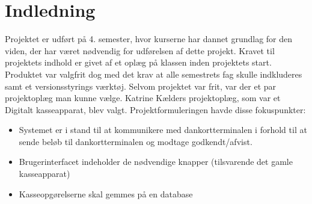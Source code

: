 \chapter{Indledning}

Projektet er udført på 4. semester, hvor kurserne har dannet grundlag for den viden, der har været nødvendig for udførelsen af dette projekt. Kravet til projektets indhold er givet af et oplæg på klassen inden projektets start. Produktet var valgfrit dog med det krav at alle semestrets fag skulle indkluderes samt et versionsstyrings værktøj.
\newline
\newline
Selvom projektet var frit, var der et par projektoplæg man kunne vælge. Katrine Kælders projektoplæg, som var et Digitalt kasseapparat, blev valgt. 
\newline
\newline
Projektformuleringen havde disse fokuspunkter:

\begin{itemize}
  \item Systemet er i stand til at kommunikere med dankortterminalen i forhold til at sende beløb til dankortterminalen og modtage godkendt/afvist.
  \item Brugerinterfacet indeholder de nødvendige knapper (tilsvarende det gamle kasseapparat)
  \item Kasseopgørelserne skal gemmes på en database
\end{itemize} 
 
